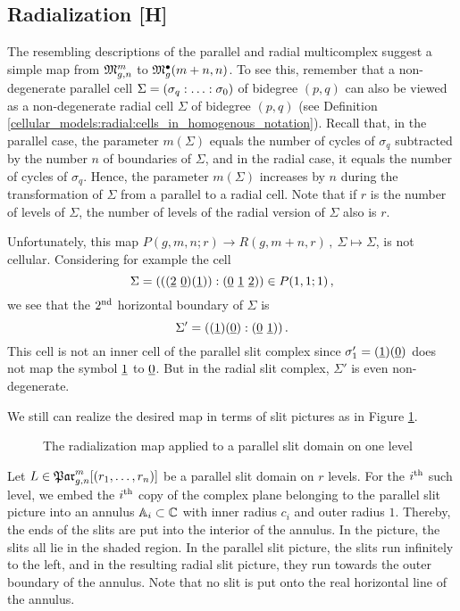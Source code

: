 \subsection{Radialization [H]}
\label{cellular_radialization}

The resembling descriptions of the parallel and radial multicomplex suggest a simple map from $\Modspc$ to $\ModspcRadm[m+n]$.
To see this, remember that a non-degenerate parallel cell $\Sigma = \homogq$ of bidegree $(p, q)$ can also be viewed as a non-degenerate radial cell $\Sigma$ of bidegree $(p, q)$ 
(see Definition \ref{cellular_models:radial:cells_in_homogenous_notation}).
Recall that, in the parallel case, the parameter $m(\Sigma)$ equals the number of cycles of $\sigma_q$ subtracted by the number $n$ of boundaries of $\Sigma$, 
and in the radial case, it equals the number of cycles of $\sigma_q$.
Hence, the parameter $m(\Sigma)$ increases by $n$ during the transformation of $\Sigma$ from a parallel to a radial cell.
Note that if $r$ is the number of levels of $\Sigma$, the number of levels of the radial version of $\Sigma$ also is $r$.

Unfortunately, this map $P(g, m, n; r) \to R(g, m + n, r)\,,\ \Sigma \mapsto \Sigma$, is not cellular. 
Considering for example the cell 
\[ 
   \Sigma = (((\ul 2 \ \ul 0) (\ul 1)) : (\ul 0 \ \ul 1 \ \ul 2)) \in P(1, 1; 1) \,,
\]
we see that the $2\nd$ horizontal boundary of $\Sigma$ is 
\[
   \Sigma' = ((\ul 1) (\ul 0) : (\ul 0 \ \ul 1))\,.
\]
This cell is not an inner cell of the parallel slit complex since $\sigma'_1 = (\ul 1)(\ul 0)$ does not map the symbol $\ul 1$ to $\ul 0$.
But in the radial slit complex, $\Sigma'$ is even non-degenerate.

We still can realize the desired map in terms of slit pictures as in Figure \ref{cellular_radialization_on_complexes}.
\begin{figure}[ht]
\centering
{}
\caption{\label{cellular_radialization_on_complexes} The radialization map applied to a parallel slit domain on one level}
\end{figure}
Let $L \in \Parr$ be a parallel slit domain on $r$ levels.
For the $i\Th$ such level, we embed the $i\Th$ copy of the complex plane belonging to the parallel slit picture into an annulus $\A_i \subset \C$ with inner radius $c_i$ and outer radius $1$.
Thereby, the ends of the slits are put into the interior of the annulus.
In the picture, the slits all lie in the shaded region.
In the parallel slit picture, the slits run infinitely to the left, and in the resulting radial slit picture, they run towards the outer boundary of the annulus.
Note that no slit is put onto the real horizontal line of the annulus.


